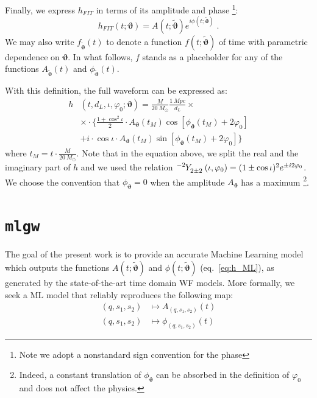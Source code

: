 Finally, we express  $h_{FIT}$ in terms of its amplitude and phase
\footnote{Note we adopt a nonstandard sign convention for the phase}:
\begin{equation} \label{eq:h_ML}
	h_{FIT}(t; \boldsymbol{\vartheta}) = A(t; \boldsymbol{\tilde{\vartheta}}) e^{i \phi(t; \boldsymbol{\tilde{\vartheta}})} \; . 
\end{equation}
We may also write $f_{\boldsymbol{\tilde{\vartheta}}}(t)$ to denote a function $f(t;\boldsymbol{\tilde{\vartheta}})$ of time with parametric dependence on $\boldsymbol{\vartheta}$.
In what follows, $f$ stands as a placeholder for any of the functions $A_{\tilde{\boldsymbol{\vartheta}}}(t)$ and ${\phi}_{\tilde{\boldsymbol{\vartheta}}}(t)$.
\par
With this definition, the full waveform can be expressed as:
\begin{align} 
	h&(t, d_L,\iota,\varphi_0; \boldsymbol{\vartheta}) = \frac{M}{\SI{20}{M_\odot}} \frac{\SI{1}{Mpc}}{d_L} \times  \nonumber \\
		&\times \cdot \Bigg\{ \frac{1+\cos^2\iota}{2} \cdot A_{\boldsymbol{\vartheta}}(t_M)  \cos[\phi_{\boldsymbol{\vartheta}}(t_M)+2\varphi_0]  \nonumber \\
		&+ i \cdot \cos\iota \cdot A_{\boldsymbol{\vartheta}}(t_M)
 \sin[\phi_{\boldsymbol{\vartheta}}(t_M)+2\varphi_0] \Bigg\}
\label{eq:h_parametrization_simple}
\end{align}
where $t_M = t \cdot \frac{M}{\SI{20}{M_\odot}}$.
Note that in the equation above, we split the real and the imaginary part of $h$ and we used the relation ${\tensor[^{-2}]{Y}{_{2 \pm 2}}(\iota, \varphi_0) = (1 \pm \cos \iota)^2 e^{\pm i 2 \varphi_0}}$.
We choose the convention that $\phi_{\boldsymbol{\vartheta}} = 0$ when the amplitude $A_{\boldsymbol{\vartheta}}$ has a maximum
\footnote{Indeed, a constant translation of $\phi_{\boldsymbol{\vartheta}}$ can be absorbed in the definition of $\varphi_0$ and does not affect the physics.}.
\par

\section{\texttt{mlgw}}
\label{sec:model}
%
The goal of the present work is to provide an accurate Machine Learning model which outputs the functions $A(t;\boldsymbol{\tilde{\vartheta}})$ and $\phi(t;\boldsymbol{\tilde{\vartheta}})$ (eq.~\eqref{eq:h_ML}), as generated by the state-of-the-art time domain WF models.
More formally, we seek a ML model that reliably reproduces the following map:
\begin{align}
	(q, s_1, s_2) &\longmapsto A_{(q, s_1, s_2)}(t) \label{eq:objective_amp}\\
	(q, s_1, s_2) &\longmapsto \phi_{(q, s_1, s_2)}(t) \label{eq:objective_ph}
\end{align}

